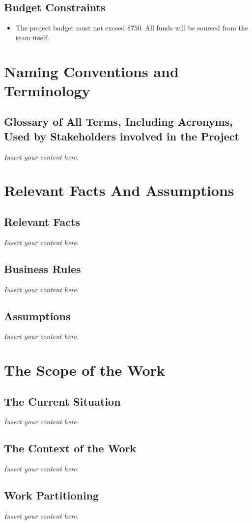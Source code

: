 \documentclass[12pt]{article}
\newcommand{\lips}{\textit{Insert your content here.}}
\begin{document}
\subsection{Budget Constraints}
\begin{itemize}
  \item The project budget must not exceed \$750. All funds will be sourced from the team itself.
\end{itemize}

\section{Naming Conventions and Terminology}
\subsection{Glossary of All Terms, Including Acronyms, Used by Stakeholders
involved in the Project}
\lips

\section{Relevant Facts And Assumptions}
\subsection{Relevant Facts}
\lips
\subsection{Business Rules}
\lips
\subsection{Assumptions}
\lips

\section{The Scope of the Work}
\subsection{The Current Situation}
\lips
\subsection{The Context of the Work}
\lips
\subsection{Work Partitioning}
\lips
\end{document}
